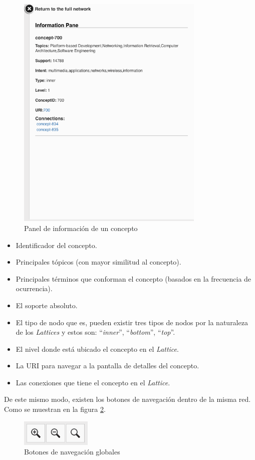 \documentclass[12pt,oneside,letterpaper]{book}
\newcommand{\eng}[1]{\textit{#1}\xspace}			%
\theoremstyle{definition}
\begin{document}
 \begin{figure}[h!]
	\centering
	\includegraphics[width=0.8\textwidth]{images/results_4.png}
	\caption{Panel de información de un concepto}
	\label{fig:results_4}
\end{figure}

\begin{itemize}
	\item Identificador del concepto.
	\item Principales tópicos (con mayor similitud al concepto).
	\item Principales términos que conforman el concepto (basados en la frecuencia de ocurrencia).
	\item El soporte absoluto.
	\item El tipo de nodo que es, pueden existir tres tipos de nodos por la naturaleza de los \eng{Lattices} y estos son: ``\eng{inner}'', ``\eng{bottom}'', ``\eng{top}''.
	\item El nivel donde está ubicado el concepto en el \eng{Lattice}.
	\item La URI para navegar a la pantalla de detalles del concepto.
	\item Las conexiones que tiene el concepto en el \eng{Lattice}.
\end{itemize}

De este mismo modo, existen los botones de navegación dentro de la misma red. Como se muestran en la figura \ref{fig:results_5}.
\begin{figure}[h!]
	\centering
	\includegraphics[width=0.3\textwidth]{images/results_5.png}
	\caption{Botones de navegación globales}
	\label{fig:results_5}
\end{figure}
\end{document}
